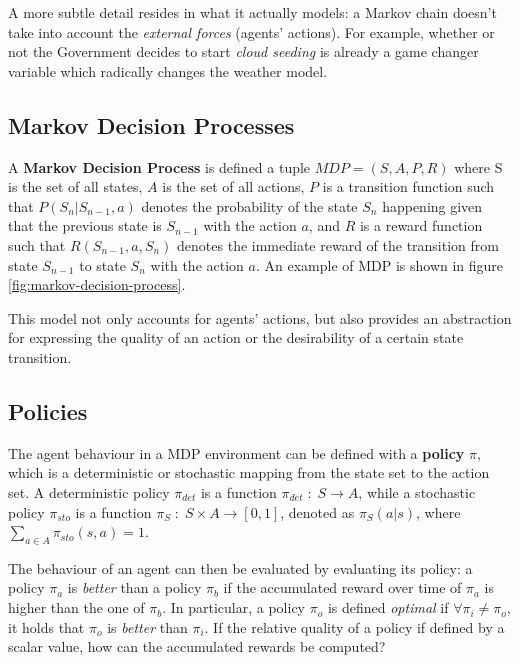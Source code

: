 A more subtle detail resides in what it actually models: a Markov chain doesn't take into account the \textit{external forces} (agents' actions). For example, whether or not the Government decides to start \textit{cloud seeding} is already a game changer variable which radically changes the weather model.


\subsection{Markov Decision Processes}

A \textbf{Markov Decision Process} is defined a tuple $MDP = (S, A, P, R)$ where S is the set of all states, $A$ is the set of all actions, $P$ is a transition function such that $P(S_n | S_{n-1}, a)$ denotes the probability of the state $S_n$ happening given that the previous state is $S_{n-1}$ with the action $a$, and $R$ is a reward function such that $R(S_{n-1}, a, S_{n})$ denotes the immediate reward of the transition from state $S_{n-1}$ to state $S_n$ with the action $a$. An example of MDP is shown in figure \ref{fig:markov-decision-process}.

This model not only accounts for agents' actions, but also provides an abstraction for expressing the quality of an action or the desirability of a certain state transition.


\subsection{Policies}

The agent behaviour in a MDP environment can be defined with a \textbf{policy} $\pi$, which is a deterministic or stochastic mapping from the state set to the action set.
A deterministic policy $\pi_{det}$ is a function $\pi_{det} \; : \; S \rightarrow A$, while a stochastic policy $\pi_{sto}$ is a function $\pi _ {S} \; : \; S \times A \rightarrow [0, 1]$, denoted as $\pi _ {S}(a | s)$, where $\sum_{a \in A} \pi _ {sto} (s, a) = 1$.

The behaviour of an agent can then be evaluated by evaluating its policy: a policy $\pi _ a$ is \textit{better} than a policy $\pi _ b$ if the accumulated reward over time of $\pi _ a$ is higher than the one of $\pi _ b$.
In particular, a policy $\pi _ o$ is defined \textit{optimal} if $\forall \pi _ i \neq \pi _ o$, it holds that $\pi _o $ is \textit{better} than $\pi _ i$.
If the relative quality of a policy if defined by a scalar value, how can the accumulated rewards be computed?

